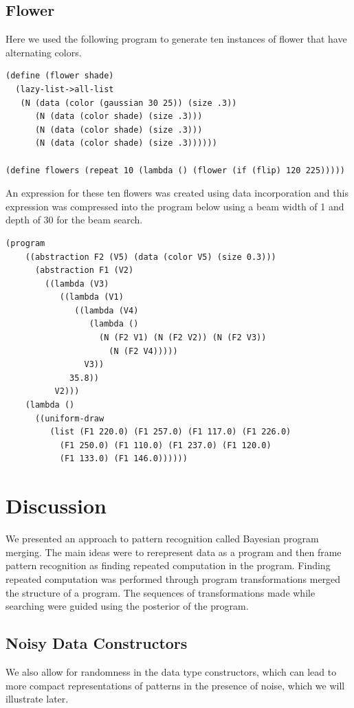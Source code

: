 \documentclass[a4paper,10pt]{article}
\begin{document}
\subsection{Flower}
Here we used the following program to generate ten instances of flower that have alternating colors.  
\begin{lstlisting}
(define (flower shade)
  (lazy-list->all-list
   (N (data (color (gaussian 30 25)) (size .3))
      (N (data (color shade) (size .3)))
      (N (data (color shade) (size .3)))
      (N (data (color shade) (size .3))))))

(define flowers (repeat 10 (lambda () (flower (if (flip) 120 225)))))
\end{lstlisting}
An expression for these ten flowers was created using data incorporation and this expression was compressed into the program below using a beam width of 1 and depth of 30 for the beam search.
\begin{lstlisting}
(program
    ((abstraction F2 (V5) (data (color V5) (size 0.3)))
      (abstraction F1 (V2)
        ((lambda (V3)
           ((lambda (V1)
              ((lambda (V4)
                 (lambda ()
                   (N (F2 V1) (N (F2 V2)) (N (F2 V3))
                     (N (F2 V4)))))
                V3))
             35.8))
          V2)))
    (lambda ()
      ((uniform-draw
         (list (F1 220.0) (F1 257.0) (F1 117.0) (F1 226.0)
           (F1 250.0) (F1 110.0) (F1 237.0) (F1 120.0)
           (F1 133.0) (F1 146.0))))))
\end{lstlisting}

\section{Discussion}
We presented an approach to pattern recognition called Bayesian program merging.  The main ideas were to rerepresent data as a program and then frame pattern recognition as finding repeated computation in the program.   Finding repeated computation was performed through program transformations merged the structure of a program.  The sequences of transformations made while searching were guided using the posterior of the program.  

\subsection{Noisy Data Constructors}
We also allow for randomness in the data type constructors, which can lead to more compact representations of patterns in the presence of noise, which we will illustrate later.
\end{document}
